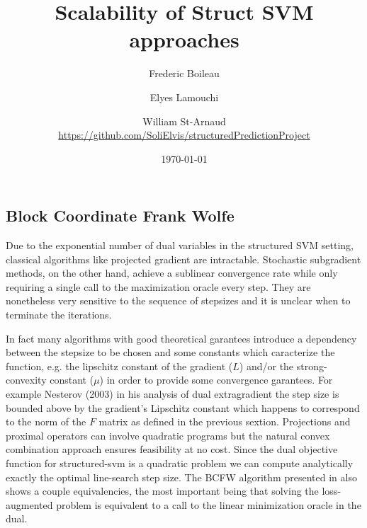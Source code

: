 
\usepackage{graphicx} %
\graphicspath{{figures/}} %
\usepackage[
  backend=biber,
  citestyle=authoryear-ibid,
  natbib=true
  ]{biblatex}
\usepackage{csquotes}
\usepackage{comment}

\usepackage{fancyhdr}
\pagestyle{fancyplain}
\fancyhf{}
\rhead{ \fancyplain{}{\today} }
\rfoot{ \fancyplain{}{\thepage} }
\renewcommand\nameyeardelim{, }

\usepackage[toc,page]{appendix}



\title{Scalability of Struct SVM approaches}
\date{\today}
\author{Frederic Boileau \and Elyes Lamouchi \and William St-Arnaud \\
\url{https://github.com/SoliElvis/structuredPredictionProject}}


\subsection{Block Coordinate Frank Wolfe}
Due to the exponential number of dual variables in the structured SVM setting,
classical algorithms like projected gradient are intractable. Stochastic
subgradient methods, on the other hand, achieve a sublinear convergence rate
while only requiring a single call to the maximization oracle every step. They
are nonetheless very sensitive to the sequence of stepsizes and it is unclear
when to terminate the iterations. 

In fact many algorithms with good theoretical garantees introduce a dependency
between the stepsize to be chosen and some constants which caracterize the
function, e.g. the lipschitz constant of the gradient ($L$) and/or the
strong-convexity constant ($\mu$) in order to provide some convergence
garantees. For example Nesterov (2003) in his analysis of dual extragradient the
step size is bounded above by the gradient's Lipschitz constant which happens to
correspond to the norm of the $F$ matrix as defined in the previous sextion.
Projections and proximal operators can involve quadratic programs but the
natural convex combination approach ensures feasibility at no cost. Since the
dual objective function for structured-svm is a quadratic problem we can compute
analytically exactly the optimal line-search step size. The BCFW algorithm
presented in \citet{lacoste-julienBlockCoordinateFrankWolfeOptimization2013}
also shows a couple equivalencies, the most important being that solving the
loss-augmented problem is equivalent to a call to the linear minimization oracle
in the dual.

